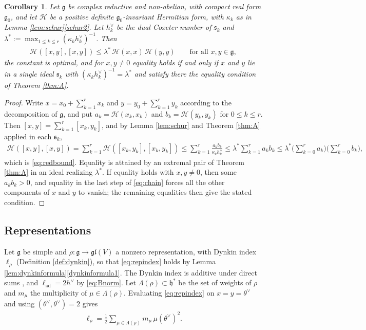 \documentclass[leqno,10pt]{amsart}
\newtheorem{corollary}[theorem]{Corollary}%
\theoremstyle{definition}
\numberwithin{equation}{section}
\newcommand{\h}{\mathfrak{h}}
\newcommand{\gl}{\mathfrak{gl}}
\newcommand{\g}{\mathfrak{g}}
\newcommand{\gz}{\g_{0}}
\newcommand{\hv}{h^\vee}
\newcommand{\HH}{\mathcal H}
\newcommand{\subs}{\mathfrak{s}}
\begin{document}
\begin{corollary}\label{thm:reductive}
Let $\g$ be complex reductive and non-abelian, with compact real form $\gz$, and let $\HH$ be a positive definite $\gz$-invariant Hermitian form, with $\kappa_{k}$ as in Lemma \ref{lem:schur}\ref{schur2}. Let $h_{k}^{\vee}$ be the dual Coxeter number of $\subs_{k}$ and $\lambda^{\ast} := \max_{1 \leq k \leq r}(\kappa_{k}h_{k}^{\vee})^{-1}$. Then
\begin{align}\label{eq:redbound}
\HH([x, y], [x, y]) \leq \lambda^{\ast}\,\HH(x, x)\,\HH(y, y) \qquad \text{for all } x, y \in \g,
\end{align}
the constant is optimal, and for $x, y \neq 0$ equality holds if and only if $x$ and $y$ lie in a single ideal $\subs_{k}$ with $(\kappa_{k}h_{k}^{\vee})^{-1} = \lambda^{\ast}$ and satisfy there the equality condition of Theorem \ref{thm:A}.
\end{corollary}
\begin{proof}
Write $x = x_{0} + \sum_{k=1}^{r}x_{k}$ and $y = y_{0} + \sum_{k=1}^{r}y_{k}$ according to the decomposition of $\g$, and put $a_{k} = \HH(x_{k}, x_{k})$ and $b_{k} = \HH(y_{k}, y_{k})$ for $0 \leq k \leq r$. Then $[x, y] = \sum_{k=1}^{r}[x_{k}, y_{k}]$, and by Lemma \ref{lem:schur} and Theorem \ref{thm:A} applied in each $\subs_{k}$,
\begin{align}\label{eq:chain}
\HH([x, y], [x, y]) = \sum_{k=1}^{r}\HH([x_{k}, y_{k}], [x_{k}, y_{k}]) \leq \sum_{k=1}^{r}\frac{a_{k}b_{k}}{\kappa_{k}h_{k}^{\vee}} \leq \lambda^{\ast}\sum_{k=1}^{r}a_{k}b_{k} \leq \lambda^{\ast}\Big(\sum_{k=0}^{r}a_{k}\Big)\Big(\sum_{k=0}^{r}b_{k}\Big),
\end{align}
which is \eqref{eq:redbound}. Equality is attained by an extremal pair of Theorem \ref{thm:A} in an ideal realizing $\lambda^{\ast}$. If equality holds with $x, y \neq 0$, then some $a_{k}b_{k} > 0$, and equality in the last step of \eqref{eq:chain} forces all the other components of $x$ and $y$ to vanish; the remaining equalities then give the stated condition.
\end{proof}

\subsection{Representations}
Let $\g$ be simple and $\rho: \g \to \gl(V)$ a nonzero representation, with Dynkin index $\ell_{\rho}$ (Definition \ref{def:dynkin}), so that \eqref{eq:repindex} holds by Lemma \ref{lem:dynkinformula}\ref{dynkinformula1}. The Dynkin index is additive under direct sums \cite[(2.24)]{Dynkin-semisimplesubalgebras}, and $\ell_{\mathrm{ad}} = 2\hv$ by \eqref{eq:Bnorm}. Let $\Lambda(\rho) \subset \h^{\ast}$ be the set of weights of $\rho$ and $m_{\mu}$ the multiplicity of $\mu \in \Lambda(\rho)$. Evaluating \eqref{eq:repindex} on $x = y = \theta^{\vee}$ and using $(\theta^{\vee}, \theta^{\vee}) = 2$ gives
\begin{align}\label{eq:indexweights}
\ell_{\rho} = \frac{1}{2}\sum_{\mu \in \Lambda(\rho)}m_{\mu}\,\mu(\theta^{\vee})^{2}.
\end{align}
\end{document}
